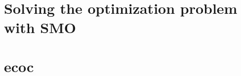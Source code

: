 \documentclass[12pt, a4paper, openany, bibliography=totoc]{report} %
\theoremstyle{definition}
\numberwithin{equation}{chapter}
\begin{document}
\chapter*{Solving the optimization problem with SMO}


\chapter*{ecoc}






  

%  
\end{document}
